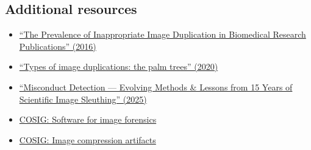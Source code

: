 \documentclass[letterpaper, 12pt]{article}
\begin{document}
\subsection*{Additional resources}

\begin{itemize}
    \setlength\itemsep{-0.5em}
    \item \href{https://doi.org/10.1128/mbio.00809-16}{``The Prevalence of Inappropriate Image Duplication in Biomedical Research Publications'' (2016)}
    \item \href{https://scienceintegritydigest.com/2020/01/08/types-of-image-duplications/}{``Types of image duplications: the palm trees'' (2020)}
    \item \href{https://doi.org/10.1017/jme.2025.32}{``Misconduct Detection — Evolving Methods \& Lessons from 15 Years of Scientific Image Sleuthing'' (2025)}
    \item \href{https://osf.io/g23pf}{COSIG: Software for image forensics}
    \item \href{https://osf.io/e5vzr}{COSIG: Image compression artifacts}
\end{itemize}
\end{document}
